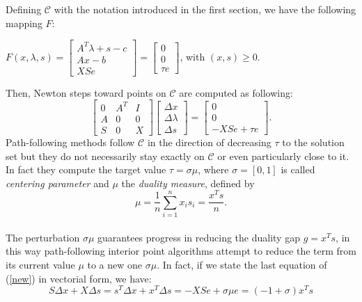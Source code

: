 \documentclass[a4paper,10 pt,titlepage,twoside]{book}
\theoremstyle{plain}
\theoremstyle{definition}
\theoremstyle{remark}
\begin{document}
 
 Defining $\mathcal{C}$ with the notation introduced in the first section, we have the following mapping $\mathit{F}$:
 \begin{center}
 	$\mathit{F}(x,\lambda,s)= \begin{bmatrix}
 	A^{T}\lambda+s-c \\Ax-b \\XSe
 	\end{bmatrix}=\begin{bmatrix} 0\\0\\ \tau e \end{bmatrix}$, with $(x,s)\geq0$.
 \end{center}
Then, Newton steps toward points on $\mathcal{C}$ are computed as following:
 \begin{equation}\label{new}
 \begin{bmatrix}
 0&A^{T}&I \\A&0&0\\S&0&X
 \end{bmatrix}\begin{bmatrix}
 \Delta x\\\Delta\lambda \\\Delta s
 \end{bmatrix}=\begin{bmatrix}
 0\\0\\-XSe + \tau e
 \end{bmatrix}.
 \end{equation}
 Path-following methods follow $\mathcal{C}$ in the direction of decreasing $\tau$ to the solution set but they do not necessarily stay exactly on $\mathcal{C}$ or even particularly close to it. In fact they compute the target value $\tau = \sigma \mu$, where $\sigma = [0,1]$ is called \textit{centering parameter} and $\mu$ the \textit{duality measure}, defined by
 \begin{equation}\label{eq:dm}
 \mu = \frac{1}{n}\sum_{i=1}^{n} x_{i}s_{i} = \frac{x^{T}s}{n}.
 \end{equation}\\
 The perturbation $\sigma\mu$ guarantees progress in reducing the duality gap $g = x^{T}s$,
 in this way path-following interior point algorithms attempt to reduce the term from
 its current value $\mu$ to a new one $\sigma\mu$. In fact, if we state the last equation of (\ref{new}) in vectorial form, we have:
 \begin{equation}
 S\Delta x + X\Delta s = s^{T}\Delta x + x^{T}\Delta s = - XSe + \sigma \mu e = (-1 + \sigma)x^{T}s
 \end{equation}
\end{document}
